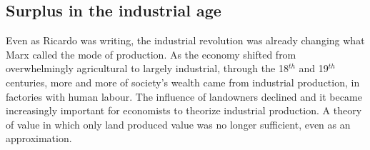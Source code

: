 
\subsection{Surplus in the industrial age}

Even as Ricardo was writing, the industrial revolution was already changing what Marx called the mode of production.  As the economy shifted  from overwhelmingly agricultural to largely industrial,  through %
the 18$^{th}$  and 19$^{th}$ centuries, more and more of society's wealth came from industrial production, in factories with human labour. The influence of landowners declined and it became increasingly important for economists to theorize industrial production. A theory of value in which only land produced value was no longer sufficient, even as an approximation. 


